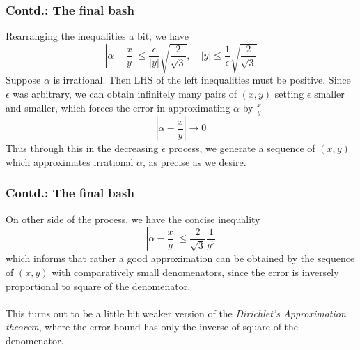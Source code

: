 \documentclass{beamer}
\begin{document}
    \begin{frame}
        \frametitle{Contd.: The final bash}
        Rearranging the inequalities a bit, we have \[\left|\alpha - \frac{x}{y}\right| \leq \frac{\epsilon}{|y|}\sqrt{\frac{2}{\sqrt{3}}}, \quad |y| \leq \frac{1}{\epsilon}\sqrt{\frac{2}{\sqrt{3}}}\] Suppose \(\alpha\) is irrational. Then LHS of the left inequalities must be positive. Since \(\epsilon\) was arbitrary, we can obtain infinitely many pairs of \((x,y)\) setting \(\epsilon\) smaller and smaller, which forces the error in approximating \(\alpha\) by \(\frac{x}{y}\) \[\left|\alpha - \frac{x}{y}\right| \to 0\] Thus through this in the decreasing \(\epsilon\) process, we generate a sequence of \((x,y)\) which approximates irrational \(\alpha\), as precise as we desire. 
    \end{frame}

    \begin{frame}
        \frametitle{Contd.: The final bash}
        On other side of the process, we have the concise inequality \[\left|\alpha - \frac{x}{y}\right| \leq \frac{2}{\sqrt{3}} \frac{1}{y^2}\] which informs that rather a good approximation can be obtained by the sequence of \((x,y)\) with comparatively small denomenators, since the error is inversely proportional to square of the denomenator. \\~\\

        This turns out to be a little bit weaker version of the \emph{Dirichlet's Approximation theorem}, where the error bound has only the inverse of square of the denomenator.
    \end{frame}
\end{document}
